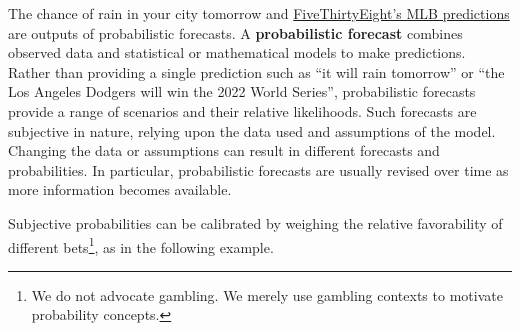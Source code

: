 \documentclass[
  letterpaper,
  DIV=11,
  numbers=noendperiod]{scrreprt}
\theoremstyle{plain}
\theoremstyle{definition}
\theoremstyle{definition}
\theoremstyle{definition}
\theoremstyle{remark}
\begin{document}
The chance of rain in your city tomorrow and
\href{https://fivethirtyeight.com/features/how-our-mlb-predictions-work/}{FiveThirtyEight's
MLB predictions} are outputs of probabilistic forecasts. A
\textbf{probabilistic forecast} combines observed data and statistical
or mathematical models to make predictions. Rather than providing a
single prediction such as ``it will rain tomorrow'' or ``the Los Angeles
Dodgers will win the 2022 World Series'', probabilistic forecasts
provide a range of scenarios and their relative likelihoods. Such
forecasts are subjective in nature, relying upon the data used and
assumptions of the model. Changing the data or assumptions can result in
different forecasts and probabilities. In particular, probabilistic
forecasts are usually revised over time as more information becomes
available.

Subjective probabilities can be calibrated by weighing the relative
favorability of different bets\footnote{We do not advocate gambling. We
  merely use gambling contexts to motivate probability concepts.}, as in
the following example.
\end{document}

